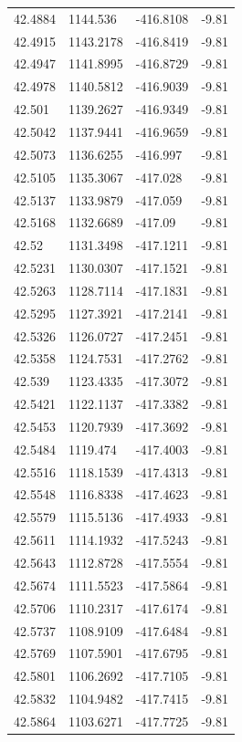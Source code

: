 \begin{table}[H]
\begin{tabular}{llll}
42.4884 & 1144.536 & -416.8108 & -9.81 \\
42.4915 & 1143.2178 & -416.8419 & -9.81 \\
42.4947 & 1141.8995 & -416.8729 & -9.81 \\
42.4978 & 1140.5812 & -416.9039 & -9.81 \\
42.501 & 1139.2627 & -416.9349 & -9.81 \\
42.5042 & 1137.9441 & -416.9659 & -9.81 \\
42.5073 & 1136.6255 & -416.997 & -9.81 \\
42.5105 & 1135.3067 & -417.028 & -9.81 \\
42.5137 & 1133.9879 & -417.059 & -9.81 \\
42.5168 & 1132.6689 & -417.09 & -9.81 \\
42.52 & 1131.3498 & -417.1211 & -9.81 \\
42.5231 & 1130.0307 & -417.1521 & -9.81 \\
42.5263 & 1128.7114 & -417.1831 & -9.81 \\
42.5295 & 1127.3921 & -417.2141 & -9.81 \\
42.5326 & 1126.0727 & -417.2451 & -9.81 \\
42.5358 & 1124.7531 & -417.2762 & -9.81 \\
42.539 & 1123.4335 & -417.3072 & -9.81 \\
42.5421 & 1122.1137 & -417.3382 & -9.81 \\
42.5453 & 1120.7939 & -417.3692 & -9.81 \\
42.5484 & 1119.474 & -417.4003 & -9.81 \\
42.5516 & 1118.1539 & -417.4313 & -9.81 \\
42.5548 & 1116.8338 & -417.4623 & -9.81 \\
42.5579 & 1115.5136 & -417.4933 & -9.81 \\
42.5611 & 1114.1932 & -417.5243 & -9.81 \\
42.5643 & 1112.8728 & -417.5554 & -9.81 \\
42.5674 & 1111.5523 & -417.5864 & -9.81 \\
42.5706 & 1110.2317 & -417.6174 & -9.81 \\
42.5737 & 1108.9109 & -417.6484 & -9.81 \\
42.5769 & 1107.5901 & -417.6795 & -9.81 \\
42.5801 & 1106.2692 & -417.7105 & -9.81 \\
42.5832 & 1104.9482 & -417.7415 & -9.81 \\
42.5864 & 1103.6271 & -417.7725 & -9.81 \\

\end{tabular}
\end{table}
